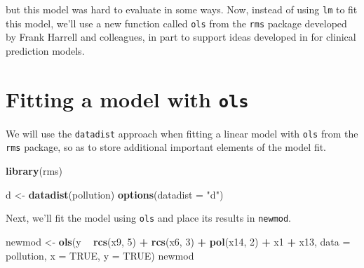 \documentclass[]{book}
\newenvironment{Shaded}{\begin{snugshade}}{\end{snugshade}}
\newcommand{\KeywordTok}[1]{\textcolor[rgb]{0.13,0.29,0.53}{\textbf{#1}}}
\newcommand{\DataTypeTok}[1]{\textcolor[rgb]{0.13,0.29,0.53}{#1}}
\newcommand{\DecValTok}[1]{\textcolor[rgb]{0.00,0.00,0.81}{#1}}
\newcommand{\StringTok}[1]{\textcolor[rgb]{0.31,0.60,0.02}{#1}}
\newcommand{\OtherTok}[1]{\textcolor[rgb]{0.56,0.35,0.01}{#1}}
\newcommand{\OperatorTok}[1]{\textcolor[rgb]{0.81,0.36,0.00}{\textbf{#1}}}
\newcommand{\NormalTok}[1]{#1}
\theoremstyle{definition}
\theoremstyle{definition}
\theoremstyle{definition}
\theoremstyle{remark}
\begin{document}
but this model was hard to evaluate in some ways. Now, instead of using
\texttt{lm} to fit this model, we'll use a new function called
\texttt{ols} from the \texttt{rms} package developed by Frank Harrell
and colleagues, in part to support ideas developed in
\citet{Harrell2001} for clinical prediction models.

\section{\texorpdfstring{Fitting a model with
\texttt{ols}}{Fitting a model with ols}}\label{fitting-a-model-with-ols}

We will use the \texttt{datadist} approach when fitting a linear model
with \texttt{ols} from the \texttt{rms} package, so as to store
additional important elements of the model fit.

\begin{Shaded}
\begin{Highlighting}[]
\KeywordTok{library}\NormalTok{(rms)}

\NormalTok{d <-}\StringTok{ }\KeywordTok{datadist}\NormalTok{(pollution)}
\KeywordTok{options}\NormalTok{(}\DataTypeTok{datadist =} \StringTok{"d"}\NormalTok{)}
\end{Highlighting}
\end{Shaded}

Next, we'll fit the model using \texttt{ols} and place its results in
\texttt{newmod}.

\begin{Shaded}
\begin{Highlighting}[]
\NormalTok{newmod <-}\StringTok{ }\KeywordTok{ols}\NormalTok{(y }\OperatorTok{~}\StringTok{ }\KeywordTok{rcs}\NormalTok{(x9, }\DecValTok{5}\NormalTok{) }\OperatorTok{+}\StringTok{ }\KeywordTok{rcs}\NormalTok{(x6, }\DecValTok{3}\NormalTok{) }\OperatorTok{+}\StringTok{ }\KeywordTok{pol}\NormalTok{(x14, }\DecValTok{2}\NormalTok{) }\OperatorTok{+}\StringTok{ }
\StringTok{                  }\NormalTok{x1 }\OperatorTok{+}\StringTok{ }\NormalTok{x13, }
              \DataTypeTok{data =}\NormalTok{ pollution, }\DataTypeTok{x =} \OtherTok{TRUE}\NormalTok{, }\DataTypeTok{y =} \OtherTok{TRUE}\NormalTok{)}
\NormalTok{newmod}
\end{Highlighting}
\end{Shaded}
\end{document}
